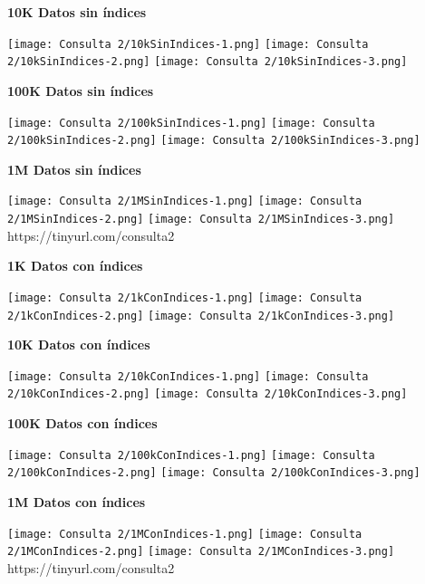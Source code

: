 \documentclass[12pt,a4paper]{article}
\begin{document}
\textbf{10K Datos sin índices}
\begin{center}
    \texttt{[image: Consulta 2/10kSinIndices-1.png]}
    \texttt{[image: Consulta 2/10kSinIndices-2.png]}
    \texttt{[image: Consulta 2/10kSinIndices-3.png]}
\end{center}

\textbf{100K Datos sin índices}
\begin{center}
    \texttt{[image: Consulta 2/100kSinIndices-1.png]}
    \texttt{[image: Consulta 2/100kSinIndices-2.png]}
    \texttt{[image: Consulta 2/100kSinIndices-3.png]}
\end{center}

\textbf{1M Datos sin índices}
\begin{center}
    \texttt{[image: Consulta 2/1MSinIndices-1.png]}
    \texttt{[image: Consulta 2/1MSinIndices-2.png]}
    \texttt{[image: Consulta 2/1MSinIndices-3.png]}
    https://tinyurl.com/consulta2
\end{center}

\textbf{1K Datos con índices}
\begin{center}
    \texttt{[image: Consulta 2/1kConIndices-1.png]}
    \texttt{[image: Consulta 2/1kConIndices-2.png]}
    \texttt{[image: Consulta 2/1kConIndices-3.png]}
\end{center}
\textbf{10K Datos con índices}
\begin{center}
    \texttt{[image: Consulta 2/10kConIndices-1.png]}
    \texttt{[image: Consulta 2/10kConIndices-2.png]}
    \texttt{[image: Consulta 2/10kConIndices-3.png]}
\end{center}
\textbf{100K Datos con índices}
\begin{center}
    \texttt{[image: Consulta 2/100kConIndices-1.png]}
    \texttt{[image: Consulta 2/100kConIndices-2.png]}
    \texttt{[image: Consulta 2/100kConIndices-3.png]}
\end{center}

\textbf{1M Datos con índices}
\begin{center}
    \texttt{[image: Consulta 2/1MConIndices-1.png]}
    \texttt{[image: Consulta 2/1MConIndices-2.png]}
    \texttt{[image: Consulta 2/1MConIndices-3.png]}
    https://tinyurl.com/consulta2
\end{center}
\end{document}
